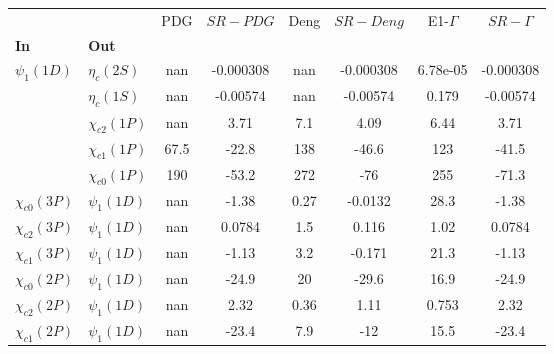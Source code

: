 \begin{tabular}{l|l|c|c|c|c|c|c}
\toprule
                &                &  PDG &  $SR-PDG$ &  Deng & $SR-Deng$ &  E1-$\Gamma$ & $SR-\Gamma$ \\
\textbf{In} & \textbf{Out} &      &           &       &           &              &             \\
\midrule
\textbf{$\psi_{1}(1D)$} & \textbf{$\eta_{c}(2S)$} &  nan & -0.000308 &   nan & -0.000308 &     6.78e-05 &   -0.000308 \\
                & \textbf{$\eta_{c}(1S)$} &  nan &  -0.00574 &   nan &  -0.00574 &        0.179 &    -0.00574 \\
                & \textbf{$\chi_{c2}(1P)$} &  nan &      3.71 &   7.1 &      4.09 &         6.44 &        3.71 \\
                & \textbf{$\chi_{c1}(1P)$} & 67.5 &     -22.8 &   138 &     -46.6 &          123 &       -41.5 \\
                & \textbf{$\chi_{c0}(1P)$} &  190 &     -53.2 &   272 &       -76 &          255 &       -71.3 \\
\textbf{$\chi_{c0}(3P)$} & \textbf{$\psi_{1}(1D)$} &  nan &     -1.38 &  0.27 &   -0.0132 &         28.3 &       -1.38 \\
\textbf{$\chi_{c2}(3P)$} & \textbf{$\psi_{1}(1D)$} &  nan &    0.0784 &   1.5 &     0.116 &         1.02 &      0.0784 \\
\textbf{$\chi_{c1}(3P)$} & \textbf{$\psi_{1}(1D)$} &  nan &     -1.13 &   3.2 &    -0.171 &         21.3 &       -1.13 \\
\textbf{$\chi_{c0}(2P)$} & \textbf{$\psi_{1}(1D)$} &  nan &     -24.9 &    20 &     -29.6 &         16.9 &       -24.9 \\
\textbf{$\chi_{c2}(2P)$} & \textbf{$\psi_{1}(1D)$} &  nan &      2.32 &  0.36 &      1.11 &        0.753 &        2.32 \\
\textbf{$\chi_{c1}(2P)$} & \textbf{$\psi_{1}(1D)$} &  nan &     -23.4 &   7.9 &       -12 &         15.5 &       -23.4 \\
\bottomrule
\end{tabular}
